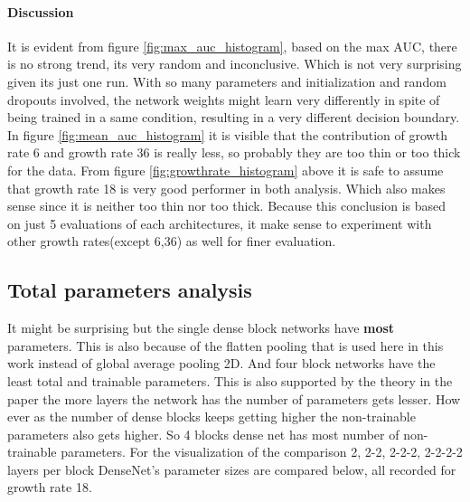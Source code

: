 \paragraph{Discussion\\}
It is evident from figure \ref{fig:max_auc_histogram}, based on the max AUC, there is no strong trend, its very random and inconclusive. Which is not very surprising given its just one run. 
With so many parameters and initialization and random dropouts involved, the network weights might learn very differently in spite of being trained in a same condition, resulting in a very different decision boundary.
In figure \ref{fig:mean_auc_histogram} it is visible that the contribution of growth rate 6 and growth rate 36 is really less, so probably they are too thin or too thick for the data. 
From figure \ref{fig:growthrate_histogram} above it is safe to assume that growth rate 18 is very good performer in both analysis. Which also makes sense since it is neither too thin nor too thick. Because this conclusion 
is based on just 5 evaluations of each architectures, it make sense to experiment with other growth rates(except 6,36) as well for finer evaluation.

\flushbottom
\newpage
\subsection{Total parameters analysis}
It might be surprising but the single dense block networks have \textbf{most} parameters. This is also because of the flatten pooling that is used here in this work instead of global average pooling 2D. 
And four block networks have the least total and trainable parameters. This is also supported by the theory in the paper \cite{densenet} the more layers the network has the number of parameters gets lesser.
How ever as the number of dense blocks keeps getting higher the non-trainable parameters also gets higher. So 4 blocks dense net has most number of non-trainable parameters.
For the visualization of the comparison 2, 2-2, 2-2-2, 2-2-2-2 layers per block DenseNet's parameter sizes are compared below, all recorded for growth rate 18.

